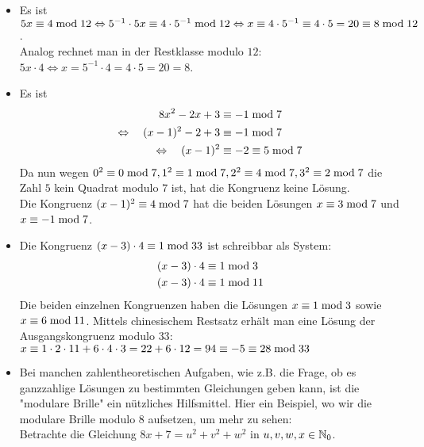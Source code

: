 	\begin{itemize}
		\item Es ist $5x \equiv 4 \bmod 12 \Leftrightarrow 5^{-1} \cdot 5x \equiv 4 \cdot 5^{-1} \bmod 12 \Leftrightarrow x \equiv 4 \cdot 5^{-1} \equiv 4 \cdot 5 = 20 \equiv 8 \bmod 12$. \\
		Analog rechnet man in der Restklasse modulo $12$: \\
		$5x \cdot 4 \Leftrightarrow x = 5^{-1} \cdot 4 = 4 \cdot 5 = 20 = 8$.
		\item Es ist
		\begin{equation}
		\begin{aligned}
			8x^2 - 2x + 3 &\equiv -1 \bmod 7 \\
			\Leftrightarrow \quad (x-1)^2 - 2 +3 &\equiv -1 \bmod 7 \\
			\Leftrightarrow \quad (x-1)^2 &\equiv -2 \equiv 5 \bmod 7
		\end{aligned}
		\end{equation}
		Da nun wegen $0^2 \equiv 0 \bmod 7, 1^2 \equiv 1 \bmod 7, 2^2 \equiv 4 \bmod 7, 3^2 \equiv 2 \bmod 7$ die Zahl $5$ kein Quadrat modulo $7$ ist, hat die Kongruenz keine Lösung.
		  \\
		Die Kongruenz $(x-1)^2 \equiv 4 \bmod 7$ hat die beiden Lösungen $x \equiv 3 \bmod 7$ und $x \equiv -1 \bmod 7$.
		\item Die Kongruenz $(x-3) \cdot 4 \equiv 1 \bmod 33$ ist schreibbar als System:
		\begin{equation}
		\begin{aligned}
			(x-3) \cdot 4 &\equiv 1 \bmod 3 \\
			(x-3) \cdot 4 &\equiv 1 \bmod 11
		\end{aligned}
		\end{equation}
		Die beiden einzelnen Kongruenzen haben die Lösungen $x \equiv 1 \bmod 3$ sowie $x \equiv 6 \bmod 11$. 
		Mittels chinesischem Restsatz erhält man eine Lösung der Ausgangskongruenz modulo $33$: \\
		$x \equiv 1 \cdot 2 \cdot 11 + 6 \cdot 4 \cdot 3 = 22 + 6 \cdot 12 = 94 \equiv -5 \equiv 28 \bmod 33$
		\item Bei manchen zahlentheoretischen Aufgaben, wie z.B. die Frage, ob es ganzzahlige Lösungen zu bestimmten Gleichungen geben kann, ist die "modulare Brille" ein nützliches Hilfsmittel. Hier ein Beispiel, wo wir die modulare Brille modulo $8$ aufsetzen, um mehr zu sehen: \\
		Betrachte die Gleichung $8x + 7 = u^2 + v^2 + w^2$ in $u,v,w,x \in \mathbb{N}_0$. 

\end{itemize}
